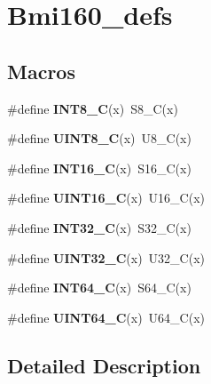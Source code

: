 \hypertarget{group__bmi160__defs}{}\section{Bmi160\+\_\+defs}
\label{group__bmi160__defs}
\subsection*{Macros}
\begin{DoxyCompactItemize}
\item 
\mbox{\label{group__bmi160__defs_ga1eaa7db37089dcdfb60227725c9c1585}} 
\#define {\bfseries I\+N\+T8\+\_\+C}(x)~S8\+\_\+C(x)
\item 
\mbox{\label{group__bmi160__defs_gacd2aa09844a8a245cf7fdbb808e215e5}} 
\#define {\bfseries U\+I\+N\+T8\+\_\+C}(x)~U8\+\_\+C(x)
\item 
\mbox{\label{group__bmi160__defs_ga838b261fec725cb0f5d5b6769d3521e7}} 
\#define {\bfseries I\+N\+T16\+\_\+C}(x)~S16\+\_\+C(x)
\item 
\mbox{\label{group__bmi160__defs_ga1cb39a2cfaf899fd38730c7637807708}} 
\#define {\bfseries U\+I\+N\+T16\+\_\+C}(x)~U16\+\_\+C(x)
\item 
\mbox{\label{group__bmi160__defs_gad78650fb7726f4e99205406569ef403d}} 
\#define {\bfseries I\+N\+T32\+\_\+C}(x)~S32\+\_\+C(x)
\item 
\mbox{\label{group__bmi160__defs_ga2451a7ede7ebd810357f1503e9898ea6}} 
\#define {\bfseries U\+I\+N\+T32\+\_\+C}(x)~U32\+\_\+C(x)
\item 
\mbox{\label{group__bmi160__defs_ga93d102802b35d3b8abae9bbe7f0fed75}} 
\#define {\bfseries I\+N\+T64\+\_\+C}(x)~S64\+\_\+C(x)
\item 
\mbox{\label{group__bmi160__defs_ga134ae84400d184ed2570e3270d5472c2}} 
\#define {\bfseries U\+I\+N\+T64\+\_\+C}(x)~U64\+\_\+C(x)
\end{DoxyCompactItemize}


\subsection{Detailed Description}

